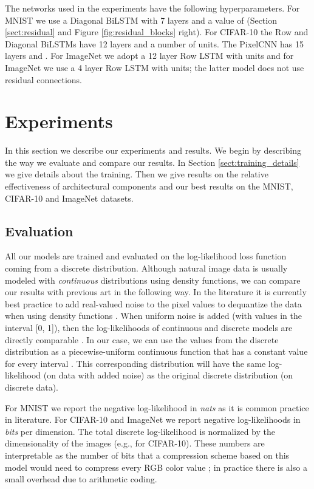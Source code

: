 \documentclass{article}
\begin{document}
The networks used in the experiments have the following hyperparameters. For MNIST we use a Diagonal BiLSTM with 7 layers and a value of   (Section \ref{sect:residual} and Figure \ref{fig:residual_blocks} right). For CIFAR-10 the Row and Diagonal BiLSTMs have 12 layers and a number of  units. The PixelCNN has 15 layers and . For  ImageNet  we adopt a 12 layer Row LSTM with  units and for  ImageNet we use a 4 layer Row LSTM with  units; the latter model does not use residual connections. 
 


\section{Experiments}
\label{sect:experiments}

In this section we describe our experiments and results.  We begin by describing the way we evaluate and compare our results. In Section \ref{sect:training_details} we give details about the training. Then we give results on the relative effectiveness of architectural components and our best results on the MNIST, CIFAR-10 and ImageNet datasets.

\subsection{Evaluation}

All our models are trained and evaluated on the log-likelihood loss function coming from a discrete distribution.
Although natural image data is usually modeled with \emph{continuous} distributions using density functions, we can compare our results with previous art in the following way. In the literature it is currently best practice to add real-valued noise to the pixel values to dequantize the data when using density functions \cite{uria2013rnade}. When uniform noise is added (with values in the interval [0, 1]), then the log-likelihoods of continuous and discrete models are directly comparable \cite{theis2015note}. In our case, we can use the values from the discrete distribution as a piecewise-uniform continuous function that has a constant value for every interval . This corresponding distribution will have the same log-likelihood (on data with added noise) as the original discrete distribution (on discrete data). 

For MNIST we report the negative log-likelihood in \emph{nats} as it is common practice in literature. For CIFAR-10 and ImageNet we report negative log-likelihoods in \emph{bits} per dimension. The total discrete log-likelihood is normalized by the dimensionality of the images (e.g.,  for CIFAR-10). These numbers are interpretable as the number of bits that a compression scheme based on this model would need to compress every RGB color value \mbox{\citep{van2014student, theis2015note}}; in practice there is also a small overhead due to arithmetic coding.
\end{document}
